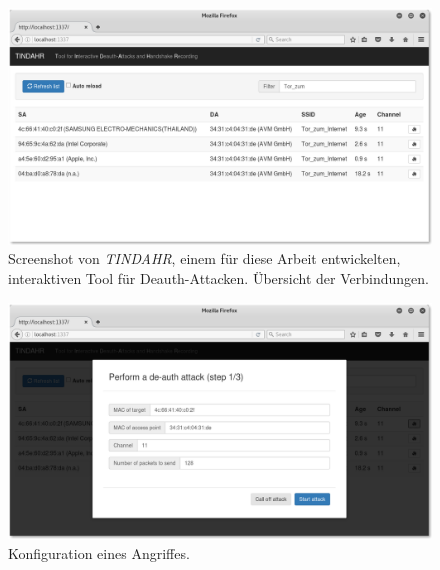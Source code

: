 \begin{figure}[ht]
	\centering
	\includegraphics[width=\textwidth]{graphics/tindahr_1}
	\caption[TINDAR -- Übersicht]{Screenshot von \textit{TINDAHR}, einem für diese Arbeit entwickelten, interaktiven Tool für Deauth-Attacken. Übersicht der Verbindungen.}
\end{figure}
\begin{figure}[ht]
	\centering
	\includegraphics[width=\textwidth]{graphics/tindahr_2}
	\caption[TINDAR -- Konfiguration Angriff]{Konfiguration eines Angriffes.}
\end{figure}
\FloatBarrier

